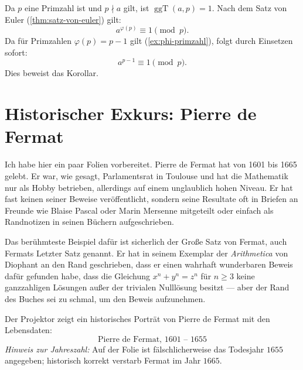 \begin{math-stroke}

\begin{short-proof}
Da $p$ eine Primzahl ist und $p \nmid a$ gilt, ist $\operatorname{ggT}(a, p) = 1$. Nach dem Satz von Euler (\cref{thm:satz-von-euler}) gilt:
\[
a^{\varphi(p)} \equiv 1 \pmod p.
\]
Da für Primzahlen $\varphi(p) = p-1$ gilt (\cref{ex:phi-primzahl}), folgt durch Einsetzen sofort:
\[
a^{p-1} \equiv 1 \pmod p.
\]
Dies beweist das Korollar.
\end{short-proof}
\end{math-stroke}

\section{Historischer Exkurs: Pierre de Fermat}

\begin{spoken-clean}[00:49:26 - 00:51:56]
Ich habe hier ein paar Folien vorbereitet.  Pierre de Fermat hat von 1601 bis 1665 gelebt. Er war, wie gesagt, Parlamentsrat in Toulouse und hat die Mathematik nur als Hobby betrieben, allerdings auf einem unglaublich hohen Niveau. Er hat fast keinen seiner Beweise veröffentlicht, sondern seine Resultate oft in Briefen an Freunde wie Blaise Pascal oder Marin Mersenne mitgeteilt oder einfach als Randnotizen in seinen Büchern aufgeschrieben.

Das berühmteste Beispiel dafür ist sicherlich der Große Satz von Fermat, auch Fermats Letzter Satz genannt. Er hat in seinem Exemplar der \emph{Arithmetica} von Diophant an den Rand geschrieben, dass er einen wahrhaft wunderbaren Beweis dafür gefunden habe, dass die Gleichung $x^n + y^n = z^n$ für $n \ge 3$ keine ganzzahligen Lösungen außer der trivialen Nulllösung besitzt --- aber der Rand des Buches sei zu schmal, um den Beweis aufzunehmen.
\end{spoken-clean}

\begin{meta-note}
Der Projektor zeigt ein historisches Porträt von Pierre de Fermat mit den Lebensdaten:
\[
\text{Pierre de Fermat, 1601 -- 1655}
\]
\emph{Hinweis zur Jahreszahl:} Auf der Folie ist fälschlicherweise das Todesjahr $1655$ angegeben; historisch korrekt verstarb Fermat im Jahr $1665$.
\end{meta-note}

